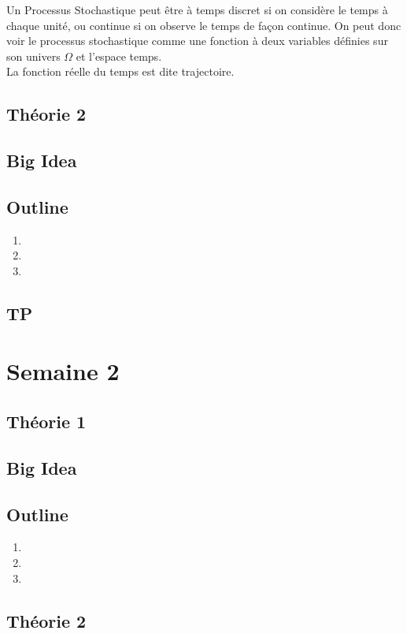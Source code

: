 \documentclass{article}
\begin{document}
Un Processus Stochastique peut être à temps discret si on considère le temps
à chaque unité, ou continue si on observe le temps de façon continue. On peut
donc voir le processus stochastique comme une fonction à deux variables définies
sur son univers $\Omega$ et l'espace temps.\\

La fonction réelle du temps est dite trajectoire.

\subsection{Théorie 2}
\subsection*{Big Idea}
\subsection*{Outline}
    \begin{enumerate}
    \item
    \item
    \item
    \end{enumerate}
\subsection{TP}

\pagebreak

\section{Semaine 2}
\subsection{Théorie 1}
\subsection*{Big Idea}
\subsection*{Outline}
    \begin{enumerate}
    \item
    \item
    \item
    \end{enumerate}
\subsection{Théorie 2}
\end{document}
